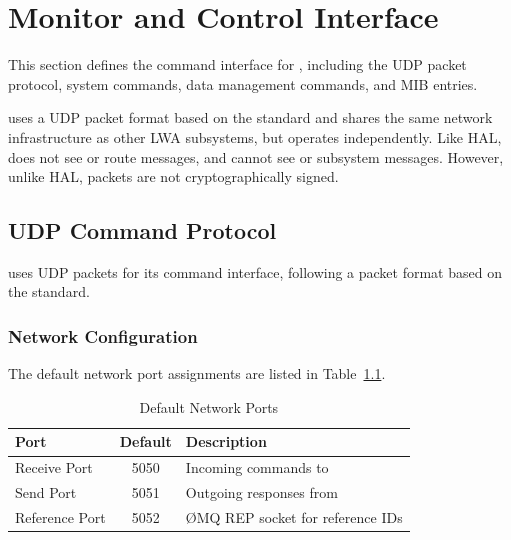 
\chapter{Monitor and Control Interface}
\label{sec:monitor-control}

This section defines the command interface for \SC{}, including the UDP packet protocol, system commands, data management commands, and MIB entries.

\begin{noteBox}
\SC{} uses a UDP packet format based on the \MCS{} standard and shares the same network infrastructure as other LWA subsystems, but operates independently. Like HAL, \MCS{} does not see or route \SC{} messages, and \SC{} cannot see \MCS{} or subsystem messages. However, unlike HAL, \SC{} packets are not cryptographically signed.
\end{noteBox}

\section{UDP Command Protocol}

\SC{} uses UDP packets for its command interface, following a packet format based on the \MCS{} standard.

\subsection{Network Configuration}

The default network port assignments are listed in Table~\ref{tab:network-ports}.

\begin{table}[htbp]
    \centering
    \caption{Default Network Ports}
    \label{tab:network-ports}
    \begin{tabular}{lcl}
        \toprule
        \textbf{Port} & \textbf{Default} & \textbf{Description} \\
        \midrule
        Receive Port & 5050 & Incoming commands to \SC{} \\
        Send Port & 5051 & Outgoing responses from \SC{} \\
        Reference Port & 5052 & \O{}MQ REP socket for reference IDs \\
        \bottomrule
    \end{tabular}
\end{table}

